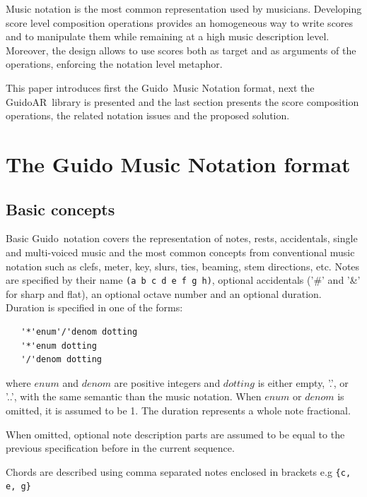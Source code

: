 \documentclass{article}
\newenvironment{gmnsyntax}		{\vspace{-2mm}\small}{\vspace{-2mm}}
\newcommand{\Guido}	{Guido}
\newcommand{\GAR}		{GuidoAR}
\newcommand{\code}[1]	{{\small \texttt{#1}}}
\begin{document}
Music notation is the most common representation used by musicians. Developing score level composition operations provides an homogeneous way to write scores and to manipulate them while remaining at a high music description level. Moreover, the design allows to use scores both as target and as arguments of the operations, enforcing the notation level metaphor.

This paper introduces first the \Guido\ Music Notation format, next the \GAR\ library is presented and the last section presents the score composition operations, the related notation issues and the proposed solution.

\section{The Guido Music Notation format}

\subsection{Basic concepts}
Basic \Guido\ notation covers the representation of notes, rests, accidentals, single and multi-voiced music and the most common concepts from conventional music notation such as clefs, meter, key, slurs, ties, beaming, stem directions, etc.
Notes are specified by their name \code{(a b c d e f g h)}, optional accidentals ('\#' and '\&' for sharp and flat), an optional octave number and an optional duration. \\
Duration is specified in one of the forms: 
\begin{gmnsyntax} 
\begin{verbatim} 
   '*'enum'/'denom dotting
   '*'enum dotting 
   '/'denom dotting
\end{verbatim}
\end{gmnsyntax} 
\noindent where $enum$ and $denom$ are positive integers and $dotting$ is either empty, '.', or '..', with the same semantic than the music notation. When $enum$ or $denom$ is omitted, it is assumed to be 1. The duration represents a whole note fractional.

When omitted, optional note description parts are assumed to be equal to the previous specification before in the current sequence.

Chords are described using comma separated notes enclosed in brackets e.g \code{\{c, e, g\}}
\end{document}
